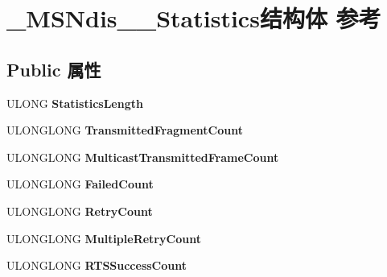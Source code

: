 \hypertarget{struct___m_s_ndis__80211___statistics}{}\section{\+\_\+\+M\+S\+Ndis\+\_\+\_\+\+Statistics结构体 参考}
\label{struct___m_s_ndis__80211___statistics}
\subsection*{Public 属性}
\begin{DoxyCompactItemize}
\item 
\mbox{\label{struct___m_s_ndis__80211___statistics_aa7347f4b969c534aabc0d07ce45a2836}} 
U\+L\+O\+NG {\bfseries Statistics\+Length}
\item 
\mbox{\label{struct___m_s_ndis__80211___statistics_af1f209f672f6ea46e25dfab0cf4a8ad0}} 
U\+L\+O\+N\+G\+L\+O\+NG {\bfseries Transmitted\+Fragment\+Count}
\item 
\mbox{\label{struct___m_s_ndis__80211___statistics_aaac4d9e50dcb57c80a5beb4915814684}} 
U\+L\+O\+N\+G\+L\+O\+NG {\bfseries Multicast\+Transmitted\+Frame\+Count}
\item 
\mbox{\label{struct___m_s_ndis__80211___statistics_aa0486709b3998b03a9e786861568a5bb}} 
U\+L\+O\+N\+G\+L\+O\+NG {\bfseries Failed\+Count}
\item 
\mbox{\label{struct___m_s_ndis__80211___statistics_a36c2d7630999693ed0807f766d143843}} 
U\+L\+O\+N\+G\+L\+O\+NG {\bfseries Retry\+Count}
\item 
\mbox{\label{struct___m_s_ndis__80211___statistics_aa3818d37639b1c2a3e2156ed5fa808e4}} 
U\+L\+O\+N\+G\+L\+O\+NG {\bfseries Multiple\+Retry\+Count}
\item 
\mbox{\label{struct___m_s_ndis__80211___statistics_a7db45ff77dd02906f187f858ad8f1495}} 
U\+L\+O\+N\+G\+L\+O\+NG {\bfseries R\+T\+S\+Success\+Count}

\end{DoxyCompactItemize}
